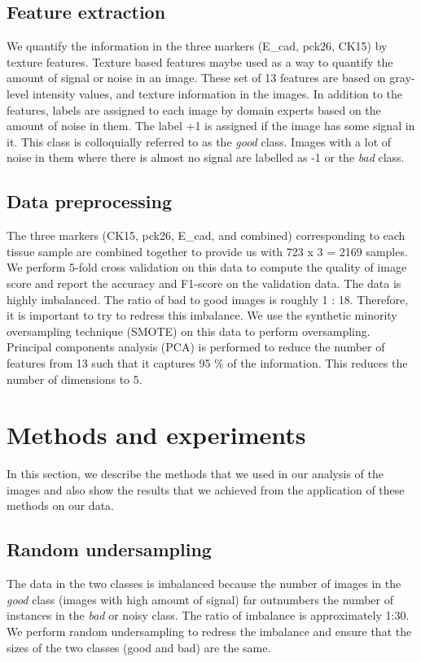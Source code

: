 \subsection{Feature extraction}

We quantify the information in the three markers (E\_cad, pck26, CK15) by texture features. Texture based features maybe used as a way to quantify the amount of signal or noise in an image.  These set of 13 features are based on gray-level intensity values, and texture information \cite{haralick1979statistical, haralick1973textural} in the images. 
In addition to the features, labels are assigned to each image by domain experts based on the amount of noise in them. The label +1 is assigned if the image has some signal in it. This class is colloquially referred to as the \textit{good} class.  Images with a lot of noise in them where there is almost no signal are labelled as -1 or the \textit{bad} class.


\subsection{Data preprocessing}
The three markers (CK15, pck26, E\_cad, and combined) corresponding to each tissue sample are combined together to provide us with 723 x 3 = 2169 samples. We perform 5-fold cross validation on this data to compute the quality of image score and report the accuracy and F1-score on the validation data.
The data is highly imbalanced. The ratio of bad to good images is roughly 1 : 18. Therefore, it is important to try to redress this imbalance. We use the synthetic minority oversampling technique (SMOTE) \cite{chawla2002smote} on this data to perform oversampling. 
Principal components analysis (PCA) \cite{world1987principal} is performed to reduce the number of features from 13 such that it captures 95 \% of the information. This reduces the number of dimensions to 5.


\section{Methods and experiments}
In this section, we describe the methods that we used in our analysis of the images and also show the results that we achieved from the application of these methods on our data.

\subsection{Random undersampling}
The data in the two classes is imbalanced because the number of images in the \textit{good} class (images with high amount of signal) far outnumbers the number of instances in the \textit{bad} or noisy class. The ratio of imbalance is approximately 1:30. We perform random undersampling to redress the imbalance and ensure that the sizes of the two classes (good and bad) are the same.

